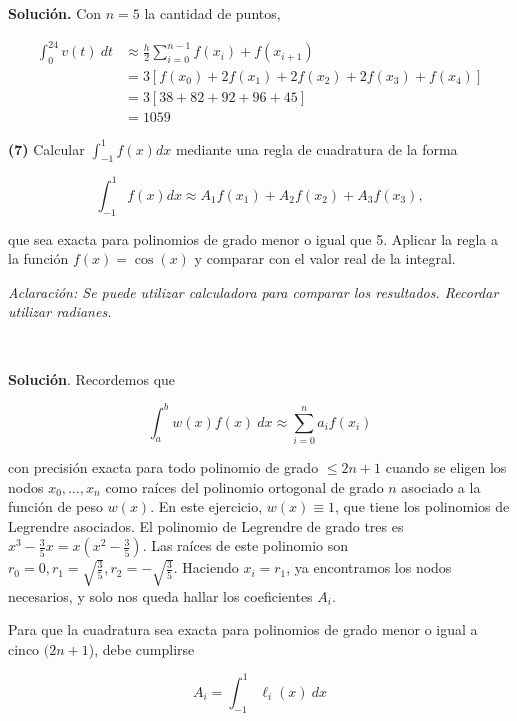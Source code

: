 \documentclass[12pt]{article}
\begin{document}
\textbf{Solución.} Con $n = 5$ la cantidad de puntos,

\begin{align*}
    \int_0^{24} v(t) ~ dt 
    &\approx \frac{h}{2}\sum_{i=0}^{n-1} f(x_i) + f(x_{i+1})\\ 
    &=3 \left[ f(x_0) + 2f(x_1) + 2 f(x_2) + 2 f(x_3) + f(x_4) \right] \\ 
    &= 3\left[ 38 + 82 + 92 + 96 + 45 \right] \\ 
    &=1059
\end{align*}

\pagebreak 

\begin{myframe}
\textbf{(7)} Calcular $\int_{-1}^{1} f(x)dx$ mediante una regla de cuadratura de la forma

\[ \int_{-1}^{1} f(x)dx \approx A_1f(x_1) + A_2f(x_2) + A_3f(x_3), \]

que sea exacta para polinomios de grado menor o igual que 5. Aplicar la regla a la función $f(x) = \cos(x)$ y comparar con el valor real de la integral.

\textit{Aclaración: Se puede utilizar calculadora para comparar los resultados. Recordar utilizar radianes.}
\end{myframe}

~ 

\textbf{Solución}. Recordemos que 

\begin{equation*}
    \int_a^b w(x) f(x) ~ dx \approx \sum_{i=0}^n a_i f(x_i)
\end{equation*}

con precisión exacta para todo polinomio de grado $\leq 2n + 1$ cuando se eligen
los nodos $x_0, \ldots, x_n$ como raíces del polinomio ortogonal de grado $n$
asociado a la función de peso $w(x)$. En este ejercicio, $w(x) \equiv 1$, que
tiene los polinomios de Legrendre asociados. El polinomio de Legrendre de grado
tres es $x^3 - \frac{3}{5}x = x(x^2 - \frac{3}{5})$. Las raíces de este
polinomio son $r_0 = 0, r_1 = \sqrt{\frac{3}{5}}, r_2 = - \sqrt{\frac{3}{5}}  $.
Haciendo $x_i = r_1$, ya encontramos los nodos necesarios, y solo nos queda
hallar los coeficientes $A_i$.

Para que la cuadratura sea exacta para polinomios de grado menor o igual a
cinco $(2n + 1$), debe cumplirse 

\begin{equation*}
    A_i = \int_{-1}^1 \ell_i(x) ~ dx
\end{equation*}
\end{document}
